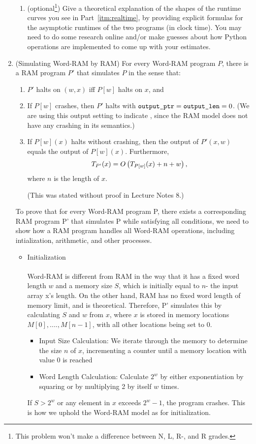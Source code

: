 \documentclass[11pt]{article}
\begin{document}
\begin{enumerate}
\begin{enumerate}
    \item (optional\footnote{This problem won't make a difference between N, L, R-, and R grades.}) Give a theoretical explanation of the shapes of the runtime curves you see in Part~\ref{itm:realtime}, by providing explicit formulas for the asymptotic runtimes of the two programs (in clock time). You may need to do some research online and/or make guesses about how Python operations are implemented to come up with your estimates. 

\end{enumerate}

\item (Simulating Word-RAM by RAM) For every Word-RAM program $P$, there is a RAM program $P'$ that simulates $P$ in the sense that:
\begin{enumerate}
    \item $P'$ halts on $(w,x)$ iff $P[w]$ halts on $x$, and 
    \item If $P[w]$ crashes, then $P'$ halts with $\texttt{output\_ptr}=\texttt{output\_len}=0$. (We are using this output setting to indicate \crash, since the RAM model does not have any crashing in its semantics.)
    \item If $P[w](x)$ halts without crashing, then the output of $P'(x,w)$ equals the output of $P[w](x)$.
     Furthermore,   
       $$T_{P'}(x) = O\left(T_{P[w]}(x)+n+w\right),$$
where $n$ is the length of $x$.

(This was stated without proof in Lecture Notes 8.) \\
\end{enumerate}
To prove that for every Word-RAM program P, there exists a corresponding RAM program P' that simulates P while satisfying all conditions, we need to show how a RAM program handles all Word-RAM operations, including intialization, arithmetic, and other processes.
\begin{itemize}
    \item Initialization
    \\\\ Word-RAM is different from RAM in the way that it has a fixed word length $w$ and a memory size $S$, which is initially equal to $n$- the input array x's length. On the other hand, RAM has no fixed word length of memory limit, and is theoretical. Therefore, P' simulates this by calculating $S$ and $w$ from $x$, where $x$ is stored in memory locations $M[0],....,M[n-1]$, with all other locations being set to 0.
    \begin{itemize}
        \item Input Size Calculation: We iterate through the memory to determine the size $n$ of $x$, incrementing a counter until a memory location with value 0 is reached
        \item Word Length Calculation: Calculate $2^w$ by either exponentiation by squaring or by multiplying 2 by itself $w$ times.
    \end{itemize}
    If $S > 2^w$ or any element in $x$ exceeds $2^w-1$, the program crashes. This is how we uphold the Word-RAM model as for initialization.


\end{itemize}
\end{enumerate}
\end{document}
